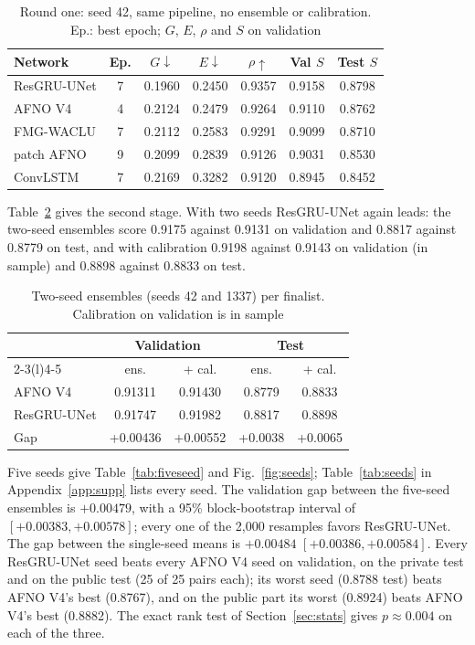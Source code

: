 \documentclass[journal]{IEEEtran}
\begin{document}
\begin{table}[!htb]
\centering
\caption{Round one: seed 42, same pipeline, no ensemble or calibration. Ep.: best epoch; $G$, $E$, $\rho$ and $S$ on validation}
\label{tab:round1}
\setlength{\tabcolsep}{3.2pt}
\begin{tabular}{@{}lcccccc@{}}
\toprule
Network & Ep. & $G\downarrow$ & $E\downarrow$ & $\rho\uparrow$ & Val $S$ & Test $S$ \\
\midrule
ResGRU-UNet & 7 & 0.1960 & 0.2450 & 0.9357 & 0.9158 & 0.8798 \\
AFNO V4 & 4 & 0.2124 & 0.2479 & 0.9264 & 0.9110 & 0.8762 \\
FMG-WACLU & 7 & 0.2112 & 0.2583 & 0.9291 & 0.9099 & 0.8710 \\
patch AFNO & 9 & 0.2099 & 0.2839 & 0.9126 & 0.9031 & 0.8530 \\
ConvLSTM & 7 & 0.2169 & 0.3282 & 0.9120 & 0.8945 & 0.8452 \\
\bottomrule
\end{tabular}
\end{table}

Table~\ref{tab:twoseed} gives the second stage. With two seeds ResGRU-UNet again leads: the two-seed ensembles score 0.9175 against 0.9131 on validation and 0.8817 against 0.8779 on test, and with calibration 0.9198 against 0.9143 on validation (in sample) and 0.8898 against 0.8833 on test.

\begin{table}[!htb]
\centering
\caption{Two-seed ensembles (seeds 42 and 1337) per finalist. Calibration on validation is in sample}
\label{tab:twoseed}
\setlength{\tabcolsep}{4pt}
\begin{tabular}{@{}lcccc@{}}
\toprule
 & \multicolumn{2}{c}{Validation} & \multicolumn{2}{c}{Test} \\
\cmidrule(lr){2-3}\cmidrule(l){4-5}
 & ens. & + cal. & ens. & + cal. \\
\midrule
AFNO V4 & 0.91311 & 0.91430 & 0.8779 & 0.8833 \\
ResGRU-UNet & 0.91747 & 0.91982 & 0.8817 & 0.8898 \\
Gap & +0.00436 & +0.00552 & +0.0038 & +0.0065 \\
\bottomrule
\end{tabular}
\end{table}

Five seeds give Table~\ref{tab:fiveseed} and Fig.~\ref{fig:seeds}; Table~\ref{tab:seeds} in Appendix~\ref{app:supp} lists every seed. The validation gap between the five-seed ensembles is $+0.00479$, with a 95\% block-bootstrap interval of $[+0.00383, +0.00578]$; every one of the 2{,}000 resamples favors ResGRU-UNet. The gap between the single-seed means is $+0.00484$ $[+0.00386, +0.00584]$. Every ResGRU-UNet seed beats every AFNO V4 seed on validation, on the private test and on the public test (25 of 25 pairs each); its worst seed (0.8788 test) beats AFNO V4's best (0.8767), and on the public part its worst (0.8924) beats AFNO V4's best (0.8882). The exact rank test of Section~\ref{sec:stats} gives $p\approx0.004$ on each of the three.
\end{document}
